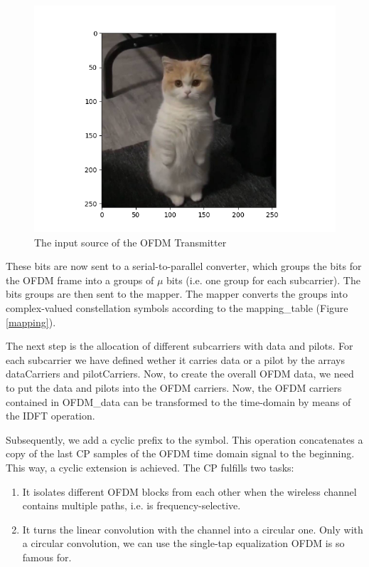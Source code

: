 \begin{figure}[htbp]
    \centering
    \includegraphics[width=\textwidth]{../Source/results/input}
    \caption{The input source of the OFDM Transmitter}
    \label{input}
\end{figure}

These bits are now sent to a serial-to-parallel converter, which groups the bits for the OFDM frame into a groups of $\mu$ bits (i.e. one group for each subcarrier). The bits groups are then sent to the mapper. The mapper converts the groups into complex-valued constellation symbols according to the mapping\_table (Figure \ref{mapping}).

The next step is the allocation of different subcarriers with data and pilots. For each subcarrier we have defined wether it carries data or a pilot by the arrays dataCarriers and pilotCarriers. Now, to create the overall OFDM data, we need to put the data and pilots into the OFDM carriers. Now, the OFDM carriers contained in OFDM\_data can be transformed to the time-domain by means of the IDFT operation.

Subsequently, we add a cyclic prefix to the symbol. This operation concatenates a copy of the last CP samples of the OFDM time domain signal to the beginning. This way, a cyclic extension is achieved. The CP fulfills two tasks:
\begin{enumerate}
    \item It isolates different OFDM blocks from each other when the wireless channel contains multiple paths, i.e. is frequency-selective.
    \item It turns the linear convolution with the channel into a circular one. Only with a circular convolution, we can use the single-tap equalization OFDM is so famous for.
\end{enumerate}

